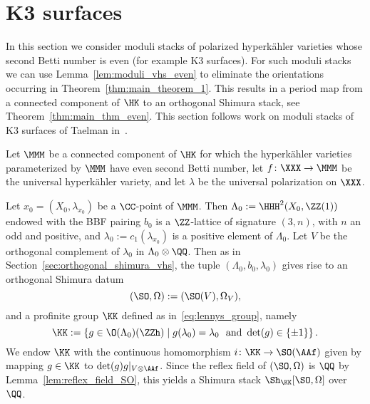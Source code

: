 \section{K3 surfaces}\label{sec:period_map_k3}
In this section we consider moduli stacks of polarized hyperk\"ahler varieties whose second Betti number is even (for example K3 surfaces). For such moduli stacks we can use Lemma~\ref{lem:moduli_vhs_even} to eliminate the orientations occurring in Theorem~\ref{thm:main_theorem_1}. This results in a period map from a connected component of $\HK$ to an orthogonal Shimura stack, see Theorem~\ref{thm:main_thm_even}. This section follows work on moduli stacks of K3 surfaces of Taelman in~\cite{TaelmanShimuraStacks}.

Let $\MMM$ be a connected component of $\HK$ for which the hyperk\"ahler varieties parameterized by $\MMM$ have even second Betti number, let $f\colon \XXX \rightarrow \MMM$ be the universal hyperk\"ahler variety, and let $\lambda$ be the universal polarization on $\XXX$.

Let $x_0 = (X_0,\lambda_{x_0})$ be a $\CC$-point of $\MMM$. Then $\Lambda_0 := \HHH^2(X_0,\ZZ(1))$ endowed with the BBF pairing $b_0$ is a $\ZZ$-lattice of signature $(3,n)$, with $n$ an odd and positive, and $\lambda_0 := c_1(\lambda_{x_0})$ is a positive element of $\Lambda_0$. Let $V$ be the orthogonal complement of $\lambda_0$ in $\Lambda_0 \otimes \QQ$. Then as in Section~\ref{sec:orthogonal_shimura_vhs}, the tuple $(\Lambda_0,b_0,\lambda_0)$ gives rise to an orthogonal Shimura datum
$$
(\SO,\Omega) := (\SO(V),\Omega_V),
$$
and a profinite group $\KK$ defined as in~\eqref{eq:lennys_group}, namely
$$
\KK := \left\{ g \in \O(\Lambda_0)(\ZZh) \mid g(\lambda_0) = \lambda_0\ \text{ and } \det(g) \in \{\pm 1\} \right\}.
$$
We endow $\KK$ with the continuous homomorphism $i\colon \KK \rightarrow \SO(\AAf)$ given by mapping $g \in \KK$ to $\det(g) g|_{V \otimes \AAf}$. Since the reflex field of $(\SO,\Omega)$ is $\QQ$ by Lemma~\ref{lem:reflex_field_SO}, this yields a Shimura stack $\Sh_{\KK}[\SO,\Omega]$ over $\QQ$.

